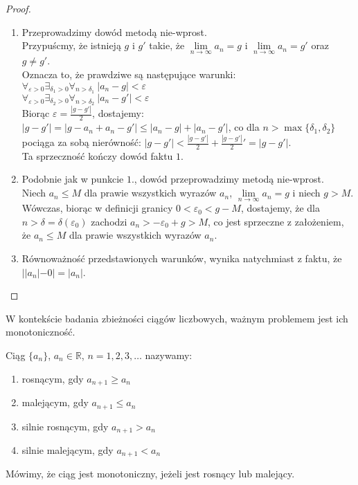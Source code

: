 \begin{proof}
\begin{enumerate}%
\item Przeprowadzimy dowód metodą nie-wprost.\\
 Przypuścmy, że istnieją $g$ i $g'$ takie, że $\lim\limits_{n\to \infty}{a_n}=g$ i $\lim\limits_{n\to \infty}{a_n}=g'$ oraz $g \neq g'$.\\
 Oznacza to, że prawdziwe są następujące warunki: \\
$ \forall_{\varepsilon >0}\exists_{\delta_1>0}\forall_{n>\delta_1}\ |a_n-g|<\varepsilon$ \\
$ \forall_{\varepsilon >0}\exists_{\delta_2>0}\forall_{n>\delta_2}\ |a_n-g'|<\varepsilon$\\
Biorąc    $\varepsilon =\frac{|g-g'|}{2}$, dostajemy:\\
$|g-g'|=|g-a_n+a_n-g'|\leq |a_n-g|+|a_n-g'|$, co dla $n>\max\{\delta_1, \delta_2\}$ pociąga za sobą nierówność: $|g-g'|<\frac{|g-g'|}{2} + \frac{|g-g'|}{2}'=|g-g'|$. \\
Ta sprzeczność kończy dowód faktu $1$.
\item Podobnie jak w punkcie $1.$, dowód przeprowadzimy metodą nie-wprost.\\ 
Niech $a_n\leq M$ dla prawie wszystkich wyrazów $a_n$, $\lim\limits_{n \to \infty}{a_n}=g$ i niech $g>M$.
Wówczas, biorąc w definicji granicy $0<\varepsilon_0 <g-M$, dostajemy, że dla $n>\delta =\delta(\varepsilon_0)$ zachodzi  
$a_n>-\varepsilon_0+g>M$, co jest sprzeczne z założeniem, że $a_n \leq M$ dla prawie wszystkich wyrazów $a_n$. 
\item Równoważność przedstawionych warunków, wynika natychmiast z faktu, że $||a_n|-0|=|a_n|$.
\end{enumerate}
\end{proof}
W kontekście badania zbieżności ciągów liczbowych, ważnym problemem jest ich monotoniczność.
\begin{definicja}
Ciąg $\{a_n\}$, $a_n\in \mathbb{R}$, $n=1, 2, 3, \dots$ nazywamy:
\begin{enumerate}
\item rosnącym, gdy $a_{n+1}\geq a_n$
\item malejącym, gdy $a_{n+1}\leq a_n$
\item silnie rosnącym, gdy $a_{n+1}>a_n$
\item silnie malejącym, gdy $a_{n+1}<a_n$
\end{enumerate}
Mówimy, że ciąg jest monotoniczny, jeżeli jest rosnący lub malejący.
\end{definicja}
